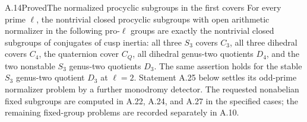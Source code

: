 

\begin{statement}{A.14}{Proved}{The normalized procyclic subgroups in the first covers}
For every prime $\ell$, the nontrivial closed procyclic subgroups
with open arithmetic normalizer in the following pro-$\ell$ groups
are exactly the nontrivial closed subgroups of conjugates of cusp
inertia: all three $S_3$ covers $C_3$, all three dihedral covers
$C_4$, the quaternion cover $C_Q$, all dihedral genus-two quotients
$D_4$, and the two nonstable $S_3$ genus-two quotients $D_3$.
The same assertion holds for the stable $S_3$ genus-two quotient
$D_3$ at $\ell=2$. Statement A.25 below settles its odd-prime
normalizer problem by a further monodromy detector. The requested
nonabelian fixed subgroups are computed in A.22, A.24, and A.27 in the
specified cases; the remaining fixed-group problems are recorded
separately in A.10.
\end{statement}
